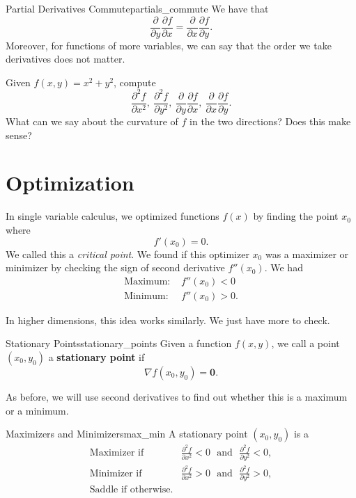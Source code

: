         \begin{prop}{Partial Derivatives Commute}{partials_commute}
        We have that
        \[
        \frac{\partial}{\partial y}\frac{\partial f}{\partial x}=\frac{\partial}{\partial x}\frac{\partial f}{\partial y}.
        \]
        Moreover, for functions of more variables, we can say that the order we take derivatives does not matter.
        \end{prop}
        
        \begin{exercise}
        Given $f(x,y)=x^2+y^2$, compute
        \[
        \frac{\partial^2 f}{\partial x^2}, ~ \frac{\partial^2 f}{\partial y^2}, ~ \frac{\partial}{\partial y}\frac{\partial f}{\partial x},~ \frac{\partial}{\partial x}\frac{\partial f}{\partial y}.
        \]
        What can we say about the curvature of $f$ in the two directions? Does this make sense?
        \end{exercise}
        
        \section{Optimization}
        In single variable calculus, we optimized functions $f(x)$ by finding the point $x_0$ where 
        \[
        f'(x_0)=0.
        \]
        We called this a \emph{critical point}. We found if this optimizer $x_0$ was a maximizer or minimizer by checking the sign of second derivative $f''(x_0)$. We had
        \begin{align*}
            \textrm{Maximum: }& f''(x_0)<0\\
            \textrm{Minimum: }& f''(x_0)>0.
        \end{align*}
        
        In higher dimensions, this idea works similarly. We just have more to check. 
        
        \begin{df}{Stationary Points}{stationary_points}
        Given a function $f(x,y)$, we call a point $(x_0,y_0)$ a \textbf{stationary point} if 
        \[
        \nabla f(x_0,y_0) = \mathbf{0}.
        \]
        \end{df}
        
        As before, we will use second derivatives to find out whether this is a maximum or a minimum.
        
        \begin{prop}{Maximizers and Minimizers}{max_min}
        A stationary point $(x_0,y_0)$ is a 
        \begin{align*}
            \textrm{Maximizer if~ }& \frac{\partial^2 f}{\partial x^2} <0 \textrm{ ~and~ } \frac{\partial^2 f}{\partial y^2}<0,\\
            \textrm{Minimizer if~ }& \frac{\partial^2 f}{\partial x^2} >0 \textrm{ ~and~ } \frac{\partial^2 f}{\partial y^2}>0,\\
            \textrm{Saddle if otherwise.}
        \end{align*}
        \end{prop}
        
